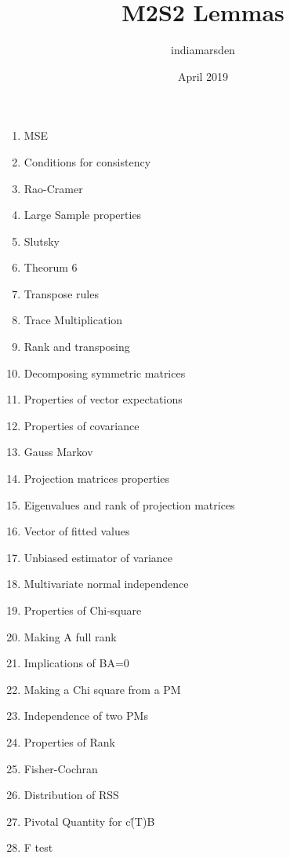 \documentclass{article}
\title{M2S2 Lemmas}
\author{indiamarsden }
\date{April 2019}
\begin{document}
\maketitle

\begin{enumerate}
    \item MSE
    \item Conditions for consistency
    \item Rao-Cramer
    \item Large Sample properties
    \item Slutsky
    \item Theorum 6
    \item Transpose rules
    \item Trace Multiplication
    \item Rank and transposing
    \item Decomposing symmetric matrices
    \item Properties of vector expectations
    \item Properties of covariance
    \item Gauss Markov
    \item Projection matrices properties
    \item Eigenvalues and rank of projection matrices
    \item Vector of fitted values
    \item Unbiased estimator of variance
    \item Multivariate normal independence
    \item Properties of Chi-square
    \item Making A full rank
    \item Implications of BA=0
    \item Making a Chi square from a PM
    \item Independence of two PMs
    \item Properties of Rank
    \item Fisher-Cochran
    \item Distribution of RSS
    \item Pivotal Quantity for c\^(T)B
    \item F test
    
\end{enumerate}
\end{document}
